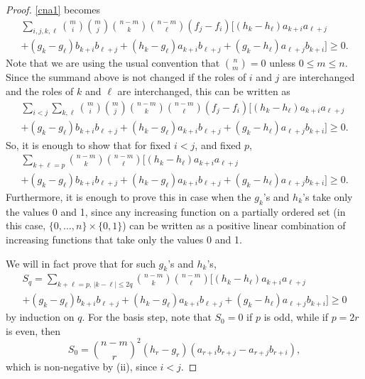 \documentclass[10pt,reqno]{amsart}
\theoremstyle{plain}
\theoremstyle{definition}
\theoremstyle{remark}
\begin{document}
\begin{proof}
\eqref{cna1} becomes
\begin{multline*}
\sum_{i,j,k,\ell}\binom mi\binom mj\binom {n-m}k\binom {n-m}\ell 
(f_j-f_i)\bigg[(h_k-h_\ell)a_{k+i}a_{\ell+j}\\+
(g_k-g_\ell)b_{k+i}b_{\ell+j}+(h_k-g_\ell)a_{k+i}b_{\ell+j}
+(g_k-h_\ell)a_{\ell+j}b_{k +i}\bigg]\geq 0.
\end{multline*}
Note that we are using the usual convention that $\binom nm=0$ unless  
$0\leq m\leq n$.
Since the summand above is not changed if the roles of $i$ and $j$  
are interchanged and the roles
of $k$ and $\ell$ are interchanged, this can be written as
\begin{multline}\label{cna2}
\sum_{i<j}\sum_{k,\ell}\binom mi\binom mj\binom {n-m}k\binom
{n-m}\ell(f_j-f_i)\bigg[(h_k-h_\ell)a_{k+i}a_{\ell+j}\\
+ (g_k-g_\ell)b_{k+i}b_{\ell +j}+(h_k-g_\ell)a_{k+i}b_{\ell+j}
+(g_k-h_\ell)a_{\ell+j}b_{k+i}\bigg]\geq 0.
\end{multline}
So, it is enough to show that for fixed $i<j$, and fixed $p$,
\begin{multline*}
\sum_{k+\ell=p}\binom {n-m}k\binom {n-m}\ell
\bigg[(h_k-h_\ell)a_{k+i} a_{\ell+j}\\
+ (g_k-g_\ell)b_{k+i}b_{\ell+j}+(h_k-g_\ell)a_{k+i}b_{\ell+j}
+(g_k-h_\ell)a_{\ell+j}b_{k +i}\bigg]\geq 0.
\end{multline*}
Furthermore, it is enough to prove this in case when the $g_k$'s and $h_k $'s 
take only the values 0 and 1,
since any increasing function on a partially ordered set (in this  case, 
$\{0,\ldots,n\}\times \{0,1\}$)
can be written as a positive linear combination of increasing  
functions that take only the values 0 and 1.

We will in fact prove that for such $g_k$'s and $h_k$'s,
\begin{multline*}
S_q=\sum_{k+\ell=p,\,|k-\ell|\leq 2q}
\binom{n-m}k\binom{n-m}\ell\bigg[(h_k-h_\ell)a_{k+i}a_{\ell+j}\\
+ (g_k-g_\ell)b_{k+i}b_{\ell+j}+(h_k-g_\ell)a_{k+i}b_{\ell+j}
+(g_k-h_\ell)a_{\ell+j}b_ {k+i}\bigg]\geq 0
\end{multline*}
by induction on $q$.  For the
basis step, note that $S_0=0$ if $p$ is odd, while if $p=2r$ is even,  
then
$$S_0=\binom{n-m}{r}^2(h_r-g_r)(a_{r+i}b_{r+j}-a_{r+j}b_{r+i}),$$
which is non-negative by (ii), since $i<j$.


\end{proof}
\end{document}

